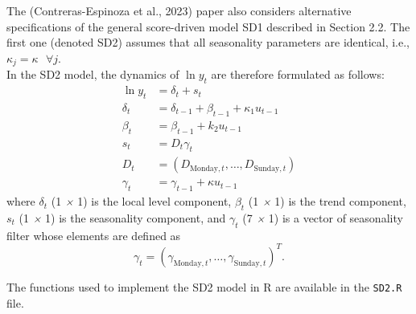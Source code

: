 The (Contreras-Espinoza et al., 2023) paper also considers alternative specifications of the general score-driven model SD1 described in Section 2.2.
The first one (denoted SD2) assumes that all seasonality parameters are identical, i.e., $\kappa_j = \kappa \ \ \ \forall j$. \\

In the SD2 model, the dynamics of $\ln y_t$ are therefore formulated as follows:
\begin{align*}
    \ln y_t & = \delta_t + s_t \\
    \delta_t &= \delta_{t-1} + \beta_{t-1} + \kappa_1 u_{t-1} \label{eq:SD1_1}\\
    \beta_t &= \beta_{t-1} + k_2 u_{t-1}\\
    s_t &= D_t \gamma_t \\
    D_t &= (D_{\text{Monday},t}, \dots, D_{\text{Sunday},t}) \\
    \gamma_t &= \gamma_{t-1} + \kappa u_{t-1} 
\end{align*}
where $\delta_t$ (1 \emph{×} 1) is the local level component, $\beta_t$ (1 \emph{×} 1) is the trend component, $s_t$ (1 \emph{×} 1) is the seasonality component, and $\gamma_t$ (7 \emph{×} 1) is a vector of seasonality filter whose elements are defined as
\begin{equation*}
    \gamma_t = (\gamma_{\text{Monday},t}, \dots, \gamma_{\text{Sunday},t})^{T}.
\end{equation*}

The functions used to implement the SD2 model in R are available in the \texttt{SD2.R} file. 